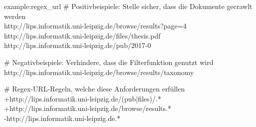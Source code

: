 \begin{example}{example:regex_url}
\# Positivbeispiele: Stelle sicher, dass die Dokumente gecrawlt werden\\
http://lips.informatik.uni-leipzig.de/browse/results?page=4\\
http://lips.informatik.uni-leipzig.de/files/thesis.pdf\\
http://lips.informatik.uni-leipzig.de/pub/2017-0

\# Negativbeispiele: Verhindere, dass die Filterfunktion genutzt wird\\
http://lips.informatik.uni-leipzig.de/browse/results/taxonomy%

\# Regex-URL-Regeln, welche diese Anforderungen erfüllen\\
+http://lips.informatik.uni-leipzig.de/(pub|files)/.*\\
+http://lips.informatik.uni-leipzig.de/browse/results.*\\
-http://lips.informatik.uni-leipzig.de.*\\
\end{example}
